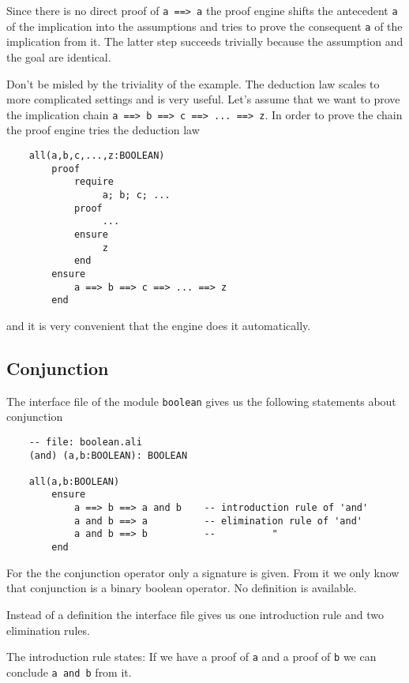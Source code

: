 Since there is no direct proof of \lstinline!a ==> a! the proof engine shifts the
antecedent \lstinline!a! of the implication into the assumptions and tries to prove the
consequent \lstinline!a! of the implication from it. The latter step succeeds trivially
because the assumption and the goal are identical.

Don't be misled by the triviality of the example. The deduction law scales to
more complicated settings and is very useful. Let's assume that we want to
prove the implication chain \lstinline!a ==> b ==> c ==> ... ==> z!. In order to prove
the chain the proof engine tries the deduction law

\begin{lstlisting}
    all(a,b,c,...,z:BOOLEAN)
        proof
            require
                 a; b; c; ...
            proof
                 ...
            ensure
                 z
            end
        ensure
            a ==> b ==> c ==> ... ==> z
        end
\end{lstlisting}

and it is very convenient that the engine does it automatically.




\subsection{Conjunction}

The interface file of the module \lstinline!boolean! gives us the following statements
about conjunction

\begin{lstlisting}
    -- file: boolean.ali
    (and) (a,b:BOOLEAN): BOOLEAN

    all(a,b:BOOLEAN)
        ensure
            a ==> b ==> a and b    -- introduction rule of 'and'
            a and b ==> a          -- elimination rule of 'and'
            a and b ==> b          --          "
        end
\end{lstlisting}

For the the conjunction operator only a signature is given. From it we only
know that conjunction is a binary boolean operator. No definition is
available.

Instead of a definition the interface file gives us one introduction rule and
two elimination rules.

The introduction rule states: If we have a proof of \lstinline!a! and a proof
of \lstinline!b! we can conclude \lstinline!a and b! from it.

